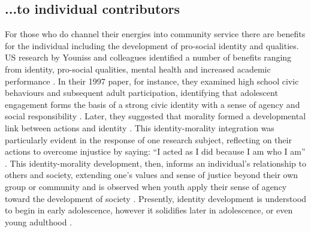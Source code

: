 \subsection{...to individual contributors}

For those who do channel their energies into community service there are benefits for the individual including the development of pro-social identity and qualities. US research by Youniss and colleagues identified a number of benefits ranging from identity, pro-social qualities, mental health and increased academic performance \citep{Kerestes2004, Youniss1997b}. In their 1997 paper, for instance, they examined high school civic behaviours and subsequent adult participation, identifying that adolescent engagement forms the basis of a strong civic identity with a sense of agency and social responsibility \citep{Youniss1997}. Later, they suggested that morality formed a developmental link between actions and identity \citep{Youniss1999a}. This identity-morality integration was particularly evident in the response of one research subject, reflecting on their actions to overcome injustice by saying: “I acted as I did because I am who I am” \citep[][p373]{Youniss1999a}. This identity-morality development, then, informs an individual's relationship to others and society, extending one's values and sense of justice beyond their own group or community and is observed when youth apply their sense of agency toward the development of society \citep{Youniss1999a}. Presently, identity development is understood to begin in early adolescence, however it solidifies later in adolescence, or even young adulthood \citep{Steinberg2003, Meeus2010}. 

